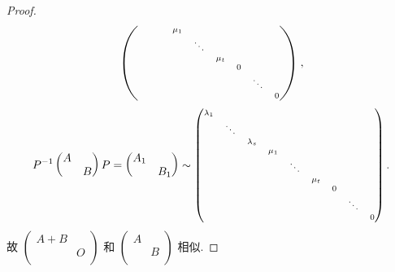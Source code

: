 \documentclass[../../main.tex]{subfiles}%
\begin{document}
\begin{proof}
\begin{align*}
\begin{scriptsize}
\begin{pmatrix}
&		&		&		\mu _1&		&		&		&		&		\\
&		&		&		&		\ddots&		&		&		&		\\
&		&		&		&		&		\mu _t&		&		&		\\
&		&		&		&		&		&		0&		&		\\
&		&		&		&		&		&		&		\ddots&		\\
&		&		&		&		&		&		&		&		0\\
\end{pmatrix}\end{scriptsize},
\end{align*}
\begin{align*}
P^{-1}\begin{pmatrix}
A&		\\
&		B\\
\end{pmatrix} P=\begin{pmatrix}
A_1&		\\
&		B_1\\
\end{pmatrix} \sim \begin{scriptsize}\begin{pmatrix}
\lambda _1&		&		&		&		&		&		&		&		\\
&		\ddots&		&		&		&		&		&		&		\\
&		&		\lambda _s&		&		&		&		&		&		\\
&		&		&		\mu _1&		&		&		&		&		\\
&		&		&		&		\ddots&		&		&		&		\\
&		&		&		&		&		\mu _t&		&		&		\\
&		&		&		&		&		&		0&		&		\\
&		&		&		&		&		&		&		\ddots&		\\
&		&		&		&		&		&		&		&		0\\
\end{pmatrix}\end{scriptsize}.
\end{align*}
故 $\begin{pmatrix}
A+B&		\\
&		O\\
\end{pmatrix}$ 和 $\begin{pmatrix}
A&		\\
&		B\\
\end{pmatrix}$ 相似.

\end{proof}
\end{document}

